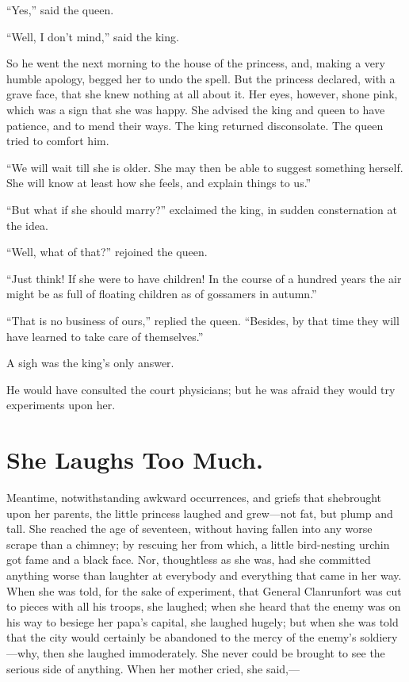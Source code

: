 \documentclass[12pt]{memoir}
\begin{document}
``Yes,'' said the queen.

``Well, I don't mind,'' said the king.

So he went the next morning to the house of the princess, and, making
a very humble apology, begged her to undo the spell.  But the princess
declared, with a grave face, that she knew nothing at all about it.
Her eyes, however, shone pink, which was a sign that she was happy.
She advised the king and queen to have patience, and to mend their
ways.  The king returned disconsolate.  The queen tried to comfort
him.

``We will wait till she is older.  She may then be able to suggest
something herself.  She will know at least how she feels, and explain
things to us.''

``But what if she should marry?'' exclaimed the king, in sudden
consternation at the idea.

``Well, what of that?'' rejoined the queen.

``Just think!  If she were to have children!  In the course of a
hundred years the air might be as full of floating children as of
gossamers in autumn.''

``That is no business of ours,'' replied the queen.  ``Besides, by
that time they will have learned to take care of themselves.''

A sigh was the king's only answer.

He would have consulted the court physicians; but he was afraid they
would try experiments upon her.


\chapter{She Laughs Too Much.}

Meantime, notwithstanding awkward occurrences, and griefs that she\linebreak[4]
brought upon her parents, the little princess laughed and grew---not
fat, but plump and tall.  She reached the age of seventeen, without
having fallen into any worse scrape than a chimney; by rescuing her
from which, a little bird-nesting urchin got fame and a black face.
Nor, thoughtless as she was, had she committed anything worse than
laughter at everybody and everything that came in her way.  When she
was told, for the sake of experiment, that General Clanrunfort was cut
to pieces with all his troops, she laughed; when she heard that the
enemy was on his way to besiege her papa's capital, she laughed
hugely; but when she was told that the city would certainly be
abandoned to the mercy of the enemy's soldiery---why, then she laughed
immoderately.  She never could be brought to see the serious side of
anything.  When her mother cried, she said,---
\end{document}
